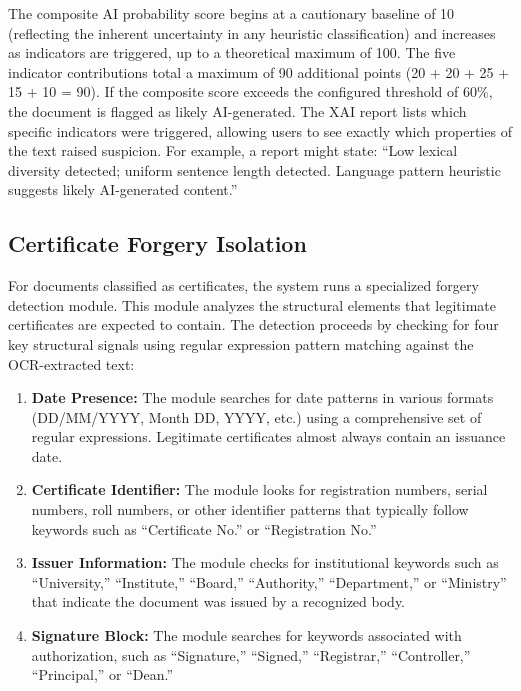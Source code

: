     The composite AI probability score begins at a cautionary baseline of 10 (reflecting the inherent uncertainty in any heuristic classification) and increases as indicators are triggered, up to a theoretical maximum of 100. The five indicator contributions total a maximum of 90 additional points (20 + 20 + 25 + 15 + 10 = 90). If the composite score exceeds the configured threshold of 60\%, the document is flagged as likely AI-generated. The XAI report lists which specific indicators were triggered, allowing users to see exactly which properties of the text raised suspicion. For example, a report might state: ``Low lexical diversity detected; uniform sentence length detected. Language pattern heuristic suggests likely AI-generated content.''


    \subsection{Certificate Forgery Isolation}
    \label{sec:Cert_forgery_isolation}
    
    For documents classified as certificates, the system runs a specialized forgery detection module. This module analyzes the structural elements that legitimate certificates are expected to contain. The detection proceeds by checking for four key structural signals using regular expression pattern matching against the OCR-extracted text:
    
    \begin{enumerate}
        \item \textbf{Date Presence:} The module searches for date patterns in various formats (DD/MM/YYYY, Month DD, YYYY, etc.) using a comprehensive set of regular expressions. Legitimate certificates almost always contain an issuance date.
    
        \item \textbf{Certificate Identifier:} The module looks for registration numbers, serial numbers, roll numbers, or other identifier patterns that typically follow keywords such as ``Certificate No.'' or ``Registration No.''
    
        \item \textbf{Issuer Information:} The module checks for institutional keywords such as ``University,'' ``Institute,'' ``Board,'' ``Authority,'' ``Department,'' or ``Ministry'' that indicate the document was issued by a recognized body.
    
        \item \textbf{Signature Block:} The module searches for keywords associated with authorization, such as ``Signature,'' ``Signed,'' ``Registrar,'' ``Controller,'' ``Principal,'' or ``Dean.''
    \end{enumerate}
    
